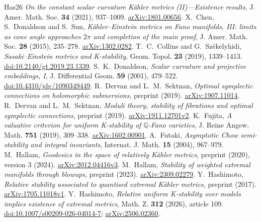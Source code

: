 \documentclass[12pt]{amsart}
\theoremstyle{definition}
\theoremstyle{remark}
\numberwithin{equation}{section}
\newcommand{\Q}{\mathbb{Q}}
\begin{document}
\begin{thebibliography}{Has26}
\emph{On the constant scalar curvature Kähler metrics (II)---Existence results},
J. Amer. Math. Soc. \textbf{34} (2021), 937--1009.
\href{https://arxiv.org/abs/1801.00656}{arXiv:1801.00656}.
X.~Chen, S.~Donaldson and S.~Sun,
\emph{Kähler--Einstein metrics on Fano manifolds, III: limits as cone angle approaches $2\pi$ and completion of the main proof},
J. Amer. Math. Soc. \textbf{28} (2015), 235--278.
\href{https://arxiv.org/abs/1302.0282}{arXiv:1302.0282}.
T.~C.~Collins and G.~Székelyhidi,
\emph{Sasaki--Einstein metrics and K-stability},
Geom. Topol. \textbf{23} (2019), 1339--1413.
\href{https://doi.org/10.2140/gt.2019.23.1339}{doi:10.2140/gt.2019.23.1339}.
S.~K.~Donaldson,
\emph{Scalar curvature and projective embeddings, I},
J. Differential Geom. \textbf{59} (2001), 479--522.
\href{https://doi.org/10.4310/jdg/1090349449}{doi:10.4310/jdg/1090349449}.
R.~Dervan and L.~M.~Sektnan,
\emph{Optimal symplectic connections on holomorphic submersions},
preprint (2019).
\href{https://arxiv.org/abs/1907.11014}{arXiv:1907.11014}.
R.~Dervan and L.~M.~Sektnan,
\emph{Moduli theory, stability of fibrations and optimal symplectic connections},
preprint (2019).
\href{https://arxiv.org/abs/1911.12701v2}{arXiv:1911.12701v2}.
K.~Fujita,
\emph{A valuative criterion for uniform K-stability of $\Q$-Fano varieties},
J. Reine Angew. Math. \textbf{751} (2019), 309--338.
\href{https://arxiv.org/abs/1602.00901}{arXiv:1602.00901}.
A.~Futaki,
\emph{Asymptotic Chow semi-stability and integral invariants},
Internat. J. Math. \textbf{15} (2004), 967--979.
M.~Hallam,
\emph{Geodesics in the space of relatively Kähler metrics},
preprint (2020), version 3 (2024).
\href{https://arxiv.org/abs/2012.04416v3}{arXiv:2012.04416v3}.
M.~Hallam,
\emph{Stability of weighted extremal manifolds through blowups},
preprint (2023).
\href{https://arxiv.org/abs/2309.02279}{arXiv:2309.02279}.
Y.~Hashimoto,
\emph{Relative stability associated to quantised extremal Kähler metrics},
preprint (2017).
\href{https://arxiv.org/abs/1705.11018v1}{arXiv:1705.11018v1}.
Y.~Hashimoto,
\emph{Relative uniform K-stability over models implies existence of extremal metrics},
Math. Z. \textbf{312} (2026), article 109.
\href{https://doi.org/10.1007/s00209-026-04014-7}{doi:10.1007/s00209-026-04014-7};
\href{https://arxiv.org/abs/2506.02360}{arXiv:2506.02360}.

\end{thebibliography}
\end{document}

